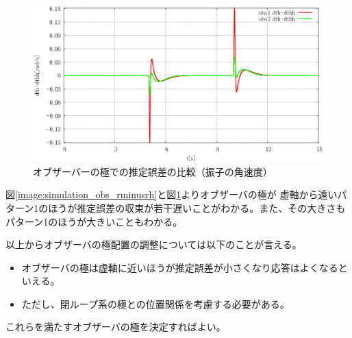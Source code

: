 	\begin{figure}[H]
		\centering
		\includegraphics[width=0.8\linewidth]{gazo/simulation_obs_compare_THETAminusTHETAH.eps}
		\caption{オブザーバーの極での推定誤差の比較（振子の角速度）}
		\label{image:simulation_obs_thetaminusthetah}
	\end{figure} 
	図\ref{image:simulation_obs_rminusrh}と図\ref{image:simulation_obs_thetaminusthetah}よりオブザーバの極が
	虚軸から遠いパターン1のほうが推定誤差の収束が若干遅いことがわかる。また、その大きさもパターン1のほうが大きいこともわかる。
	\par
	以上からオブザーバの極配置の調整については以下のことが言える。
	\begin{itemize}
	  \item オブザーバの極は虚軸に近いほうが推定誤差が小さくなり応答はよくなるといえる。
	  \item ただし、閉ループ系の極との位置関係を考慮する必要がある。
	\end{itemize}
	これらを満たすオブザーバの極を決定すればよい。
	
